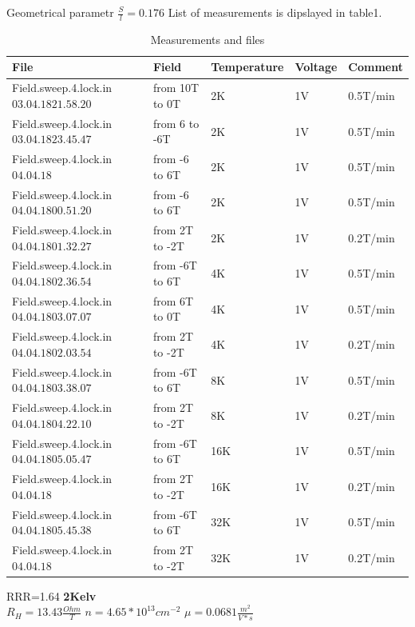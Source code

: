 \documentclass[idxtotoc,hyperref,openany,oneside]{labbook} %
\begin{document}
Geometrical parametr $\frac{S}{l}=0.176$
\newline
{}
List of measurements is dipslayed in  table1.
 \begin{table}[H]
\begin{tabular}{l l l l l}
\toprule
\textbf{File} & \textbf{Field} & \textbf{Temperature}& \textbf{Voltage}& \textbf{Comment}\\
\toprule
Field.sweep.4.lock.in$03.04.18 21.58.20$& from 10T to 0T   & 2K & 1V& 0.5T/min\\
Field.sweep.4.lock.in$03.04.18 23.45.47$& from 6 to -6T   & 2K & 1V& 0.5T/min\\
Field.sweep.4.lock.in$04.04.18 $& from -6 to 6T   & 2K & 1V& 0.5T/min\\
Field.sweep.4.lock.in$04.04.18 00.51.20$& from -6 to 6T   & 2K & 1V& 0.5T/min\\
Field.sweep.4.lock.in$04.04.18 01.32.27$& from 2T to -2T   & 2K & 1V& 0.2T/min\\
Field.sweep.4.lock.in$04.04.18 02.36.54$& from -6T to 6T   & 4K & 1V& 0.5T/min\\
Field.sweep.4.lock.in$04.04.18 03.07.07$& from 6T to 0T   & 4K & 1V& 0.5T/min\\
Field.sweep.4.lock.in$04.04.18 02.03.54$& from 2T to -2T   & 4K & 1V& 0.2T/min\\
Field.sweep.4.lock.in$04.04.18 03.38.07$& from -6T to 6T   & 8K & 1V& 0.5T/min\\
Field.sweep.4.lock.in$04.04.18 04.22.10$& from 2T to -2T   & 8K & 1V& 0.2T/min\\
Field.sweep.4.lock.in$04.04.18 05.05.47$& from -6T to 6T   & 16K & 1V& 0.5T/min\\
Field.sweep.4.lock.in$04.04.18 $& from 2T to -2T   & 16K & 1V& 0.2T/min\\
Field.sweep.4.lock.in$04.04.18 05.45.38$& from -6T to 6T   & 32K & 1V& 0.5T/min\\
Field.sweep.4.lock.in$04.04.18 $& from 2T to -2T   & 32K & 1V& 0.2T/min\\



\bottomrule
\end{tabular}
\caption{Measurements and files}
\label{tab:Measurements and files}
\end{table}

RRR=1.64
\newline
\normalsize \textbf{2Kelv}\\
$R_H=13.43 \frac{Ohm}{T}$
\newline
$n=4.65*10^{13} cm^{-2}$
\newline
$\mu= 0.0681\frac{m^2}{V*s}$
\newline
\newline
\end{document}
